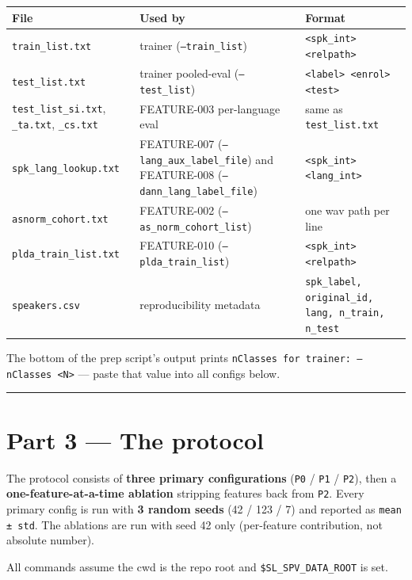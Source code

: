 \documentclass[10pt,a4paper]{article}
\renewcommand{\arraystretch}{1.15}
\begin{document}
\begin{center}
\small
\renewcommand{\arraystretch}{1.25}
\begin{tabularx}{\textwidth}{|Y|Y|Y|}
\hline
File & Used by & Format \\
\hline
\texttt{train\_list.txt} & trainer (\texttt{--train\_list}) & \texttt{<spk\_int> <relpath>} \\
\hline
\texttt{test\_list.txt} & trainer pooled-eval (\texttt{--test\_list}) & \texttt{<label> <enrol> <test>} \\
\hline
\texttt{test\_list\_si.txt}, \texttt{\_ta.txt}, \texttt{\_cs.txt} & FEATURE-003 per-language eval & same as \texttt{test\_list.txt} \\
\hline
\texttt{spk\_lang\_lookup.txt} & FEATURE-007 (\texttt{--lang\_aux\_label\_file}) and FEATURE-008 (\texttt{--dann\_lang\_label\_file}) & \texttt{<spk\_int> <lang\_int>} \\
\hline
\texttt{asnorm\_cohort.txt} & FEATURE-002 (\texttt{--as\_norm\_cohort\_list}) & one wav path per line \\
\hline
\texttt{plda\_train\_list.txt} & FEATURE-010 (\texttt{--plda\_train\_list}) & \texttt{<spk\_int> <relpath>} \\
\hline
\texttt{speakers.csv} & reproducibility metadata & \texttt{spk\_label, original\_id, lang, n\_train, n\_test} \\
\hline
\end{tabularx}
\end{center}

The bottom of the prep script's output prints \texttt{nClasses for trainer: --nClasses <N>} --- paste that value into all configs below.

\vspace{0.5em}\hrule\vspace{0.5em}

\section*{Part 3 --- The protocol}

The protocol consists of \textbf{three primary configurations} (\texttt{P0} / \texttt{P1} / \texttt{P2}), then a \textbf{one-feature-at-a-time ablation} stripping features back from \texttt{P2}. Every primary config is run with \textbf{3 random seeds} (42 / 123 / 7) and reported as \texttt{mean ± std}. The ablations are run with seed 42 only (per-feature contribution, not absolute number).

All commands assume the cwd is the repo root and \texttt{\$SL\_SPV\_DATA\_ROOT} is set.
\end{document}
